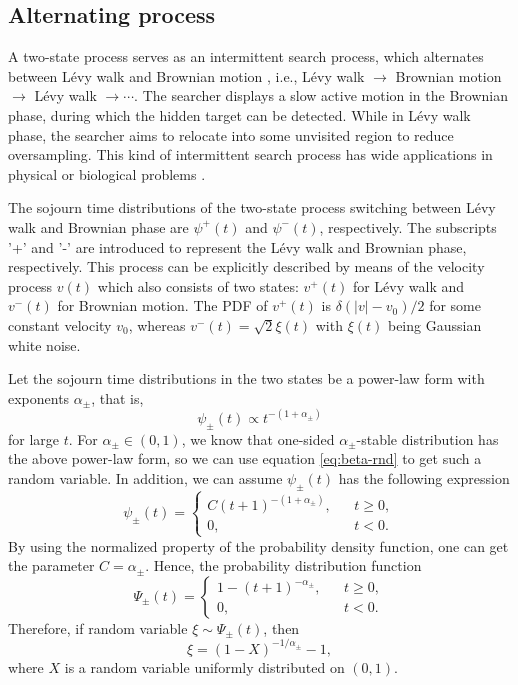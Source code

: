 \documentclass[aps, pre, preprint, amsmath, amssymb]{revtex4}
\newcommand{\xiaokuo}[1]{\left(#1\right)}
\begin{document}
\subsection{Alternating process}
A two-state process \cite{wang2019aging} serves as an intermittent search process, which alternates between L\'{e}vy walk \cite{2015, wang2019levy} and Brownian motion \cite{benichou2005optimal,lomholt2008levy}, i.e., L\'{e}vy walk $\longrightarrow$ Brownian motion $\longrightarrow$ L\'{e}vy walk $\longrightarrow \cdots$.
The searcher displays a slow active motion in the Brownian phase, during which the hidden target can be detected. 
While in L\'{e}vy walk phase, the searcher aims to relocate into some unvisited region to reduce oversampling. 
This kind of intermittent search process has wide applications in physical or biological problems \cite{bell2012searching, song2018neuronal}.

The sojourn time distributions of the two-state process switching between L\'{e}vy walk and
Brownian phase are $\psi^{+}(t)$ and $\psi^{-}(t)$, respectively. The
subscripts '+' and '-' are introduced to represent the
L\'{e}vy walk and Brownian phase, respectively. This process can be explicitly described by means of the velocity
process $v(t)$ which also consists of two states: $v^{+}(t)$ for
L\'{e}vy walk and $v^{-}(t)$ for Brownian motion. The PDF of $v^{+}(t)$ is $\delta(|v|-v_0)/2$ for some constant velocity $v_0$, whereas $v^{-}(t)=\sqrt{2}\xi(t)$ with $\xi(t)$ being Gaussian white noise.

Let the sojourn time distributions in the two states be a power-law form with exponents $\alpha_{\pm}$, that is, 
\begin{equation}
\psi_{\pm}(t) \propto t^{-(1+\alpha_{\pm})}
\end{equation}
for large $t$. For $\alpha_{\pm}\in (0,1)$, we know that one-sided $\alpha_{\pm}$-stable distribution has the above power-law form, so we can use equation \eqref{eq:beta-rnd} to get such a random variable.
In addition, we can assume $\psi_{\pm}(t)$ has the following expression
\begin{equation}
\psi_{\pm}(t)=\left\{
\begin{array}{lll}
C(t+1)^{-(1+\alpha_{\pm})}, & & t\geqslant 0, \\
0, & & t<0.
\end{array}
\right.
\end{equation}
By using the normalized property of the probability density function, one can get the parameter $C=\alpha_{\pm}$. 
Hence, the probability distribution function 
\begin{equation}
\Psi_{\pm}(t)=\left\{
\begin{array}{lll}
1-\xiaokuo{t+1}^{-\alpha_{\pm}}, & & t\geqslant 0, \\
0, & & t<0.
\end{array}
\right.	
\end{equation}
Therefore, if random variable $\xi\sim \Psi_{\pm}(t)$, then 
\begin{equation}\label{eq:power-rnd}
\xi = (1-X)^{-1/\alpha_{\pm}}-1,
\end{equation}
where $X$ is a random variable uniformly distributed on $(0,1)$.
\end{document}
